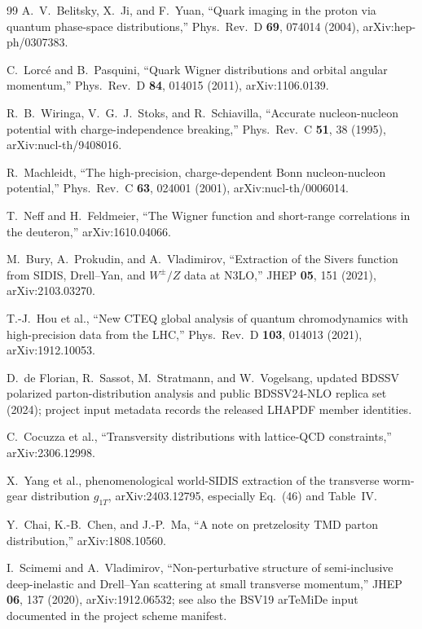 \documentclass[11pt]{article}
\begin{document}
\begin{thebibliography}{99}
A.~V.~Belitsky, X.~Ji, and F.~Yuan,
``Quark imaging in the proton via quantum phase-space distributions,''
Phys.\ Rev.\ D \textbf{69}, 074014 (2004), arXiv:hep-ph/0307383.

C.~Lorc\'e and B.~Pasquini,
``Quark Wigner distributions and orbital angular momentum,''
Phys.\ Rev.\ D \textbf{84}, 014015 (2011), arXiv:1106.0139.

R.~B.~Wiringa, V.~G.~J.~Stoks, and R.~Schiavilla,
``Accurate nucleon-nucleon potential with charge-independence breaking,''
Phys.\ Rev.\ C \textbf{51}, 38 (1995), arXiv:nucl-th/9408016.

R.~Machleidt,
``The high-precision, charge-dependent Bonn nucleon-nucleon potential,''
Phys.\ Rev.\ C \textbf{63}, 024001 (2001), arXiv:nucl-th/0006014.

T.~Neff and H.~Feldmeier,
``The Wigner function and short-range correlations in the deuteron,''
arXiv:1610.04066.

M.~Bury, A.~Prokudin, and A.~Vladimirov,
``Extraction of the Sivers function from SIDIS, Drell--Yan, and \(W^\pm/Z\)
data at N3LO,'' JHEP \textbf{05}, 151 (2021), arXiv:2103.03270.

T.-J.~Hou et al.,
``New CTEQ global analysis of quantum chromodynamics with high-precision
data from the LHC,'' Phys.\ Rev.\ D \textbf{103}, 014013 (2021),
arXiv:1912.10053.

D.~de Florian, R.~Sassot, M.~Stratmann, and W.~Vogelsang,
updated BDSSV polarized parton-distribution analysis and public
BDSSV24-NLO replica set (2024); project input metadata records the released
LHAPDF member identities.

C.~Cocuzza et al.,
``Transversity distributions with lattice-QCD constraints,''
arXiv:2306.12998.

X.~Yang et al.,
phenomenological world-SIDIS extraction of the transverse worm-gear
distribution \(g_{1T}\), arXiv:2403.12795, especially Eq.~(46) and
Table~IV.

Y.~Chai, K.-B.~Chen, and J.-P.~Ma,
``A note on pretzelosity TMD parton distribution,''
arXiv:1808.10560.

I.~Scimemi and A.~Vladimirov,
``Non-perturbative structure of semi-inclusive deep-inelastic and
Drell--Yan scattering at small transverse momentum,''
JHEP \textbf{06}, 137 (2020), arXiv:1912.06532; see also the BSV19
arTeMiDe input documented in the project scheme manifest.


\end{thebibliography}
\end{document}
